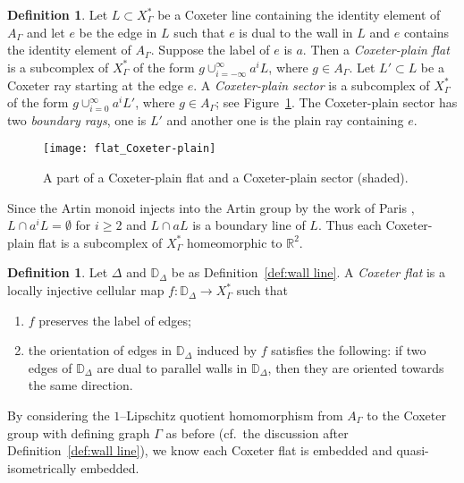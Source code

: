 \documentclass[11pt]{amsart}
\newcommand {\D}{\mathbb D}
\theoremstyle{definition}
\newtheorem{definition}[theorem]{Definition}
\newcommand{\Xa}{X^{\ast}}
\begin{document}
\begin{definition}
Let $L\subset\Xa_\Gamma$ be a Coxeter line containing the identity element of $A_\Gamma$ and let $e$ be the edge in $L$ such that $e$ is dual to the wall in $L$ and $e$ contains the identity element of $A_\Gamma$. Suppose the label of $e$ is $a$. Then a \emph{Coxeter-plain flat} is a subcomplex of $\Xa_\Gamma$ of the form $g\cup_{i=-\infty}^{\infty}a^i L$, where $g\in A_\Gamma$. Let $L'\subset L$ be a Coxeter ray starting at the edge $e$. A \emph{Coxeter-plain sector} is a subcomplex of $\Xa_\Gamma$ of the form $g\cup_{i=0}^{\infty}a^i L'$, where $g\in A_\Gamma$; see Figure~\ref{f:flat_Coxeter-plain}. The Coxeter-plain sector has two \emph{boundary rays}, one is $L'$ and another one is the plain ray containing $e$.
\end{definition}

\begin{figure}[h!]
	\centering
	\texttt{[image: flat\_Coxeter-plain]}
	\caption{A part of a Coxeter-plain flat and a Coxeter-plain sector (shaded).}
	\label{f:flat_Coxeter-plain}
\end{figure}

Since the Artin monoid injects into the Artin group by the work of Paris \cite{paris2002artin}, $L\cap a^iL=\emptyset$ for $i\ge 2$ and $L\cap aL$ is a boundary line of $L$. Thus each Coxeter-plain flat is a subcomplex of $\Xa_\Gamma$ homeomorphic to $\mathbb R^2$.

\begin{definition}
	\label{def:Coxeter flat}
Let $\Delta$ and $\D_{\Delta}$ be as Definition~\ref{def:wall line}. A \emph{Coxeter flat} is a locally injective cellular map $f\colon \D_{\Delta}\to \Xa_\Gamma$ such that 
\begin{enumerate}
	\item $f$ preserves the label of edges;
	\item the orientation of edges in $\D_\Delta$ induced by $f$ satisfies the following: if two edges of $\D_{\Delta}$ are dual to parallel walls in $\D_{\Delta}$, then they are oriented towards the same direction.
\end{enumerate}	
\end{definition}

By considering the $1$--Lipschitz quotient homomorphism from $A_\Gamma$ to the Coxeter group with defining graph $\Gamma$ as before (cf.\ the discussion after Definition~\ref{def:wall line}), we know each Coxeter flat is embedded and quasi-isometrically embedded.
\end{document}
